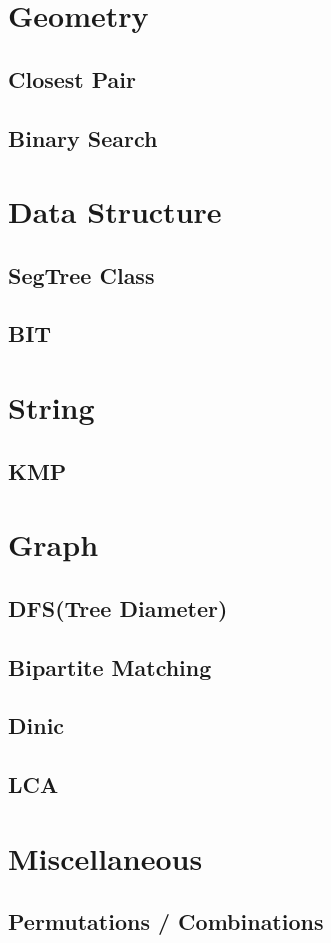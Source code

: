 \documentclass[10pt,landscape,a4paper,twocolumn]{article}
\begin{document}
\tableofcontents


\section{Geometry}
\subsection{Closest Pair}


\subsection{Binary Search}


\section{Data Structure}

\subsection{SegTree Class}


\subsection{BIT}


\section{String}
\subsection{KMP}


\section{Graph}
\subsection{DFS(Tree Diameter)}


\subsection{Bipartite Matching}


\subsection{Dinic}


\subsection{LCA}


\section{Miscellaneous}
\subsection{Permutations / Combinations}

\end{document}
